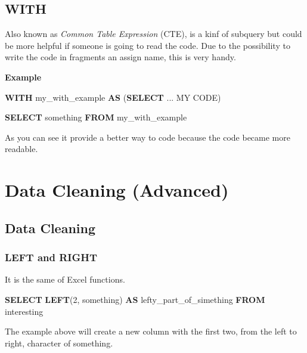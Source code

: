\documentclass[]{book}
\newenvironment{Shaded}{\begin{snugshade}}{\end{snugshade}}
\newcommand{\KeywordTok}[1]{\textcolor[rgb]{0.13,0.29,0.53}{\textbf{#1}}}
\newcommand{\DecValTok}[1]{\textcolor[rgb]{0.00,0.00,0.81}{#1}}
\newcommand{\NormalTok}[1]{#1}
\begin{document}
\subsection{WITH}\label{with}

Also known as \emph{Common Table Expression} (CTE), is a kinf of
subquery but could be more helpful if someone is going to read the code.
Due to the possibility to write the code in fragments an assign name,
this is very handy.

\textbf{Example}

\begin{Shaded}
\begin{Highlighting}[]
\KeywordTok{WITH}\NormalTok{ my_with_example }\KeywordTok{AS}\NormalTok{ (}\KeywordTok{SELECT}\NormalTok{ ... MY CODE)}

\KeywordTok{SELECT}\NormalTok{ something}
\KeywordTok{FROM}\NormalTok{ my_with_example}
\end{Highlighting}
\end{Shaded}

As you can see it provide a better way to code because the code became
more readable.

\section{Data Cleaning (Advanced)}\label{data-cleaning-advanced}

\subsection{Data Cleaning}\label{data-cleaning}

\subsubsection{LEFT and RIGHT}\label{left-and-right}

It is the same of Excel functions.

\begin{Shaded}
\begin{Highlighting}[]
\KeywordTok{SELECT} \KeywordTok{LEFT}\NormalTok{(}\DecValTok{2}\NormalTok{, something) }\KeywordTok{AS}\NormalTok{ lefty_part_of_simething}
\KeywordTok{FROM}\NormalTok{ interesting}
\end{Highlighting}
\end{Shaded}

The example above will create a new column with the first two, from the
left to right, character of something.
\end{document}
